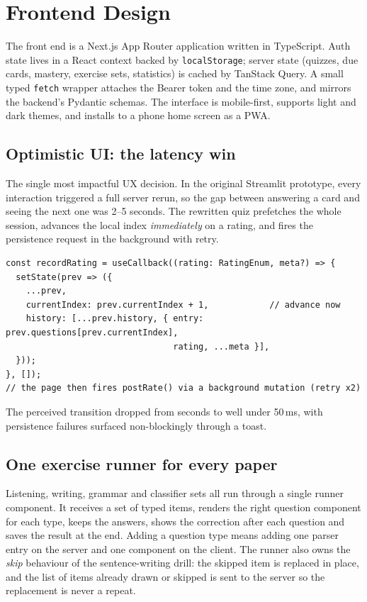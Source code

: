 \documentclass[11pt,a4paper]{article}
\begin{document}
\section{Frontend Design}

The front end is a Next.js App Router application written in TypeScript. Auth
state lives in a React context backed by \texttt{localStorage}; server state
(quizzes, due cards, mastery, exercise sets, statistics) is cached by TanStack
Query. A small typed \texttt{fetch} wrapper attaches the Bearer token and the
time zone, and mirrors the backend's Pydantic schemas. The interface is
mobile-first, supports light and dark themes, and installs to a phone home
screen as a PWA.

\subsection{Optimistic UI: the latency win}

The single most impactful UX decision. In the original Streamlit prototype,
every interaction triggered a full server rerun, so the gap between answering a
card and seeing the next one was 2--5 seconds. The rewritten quiz prefetches
the whole session, advances the local index \emph{immediately} on a rating, and
fires the persistence request in the background with retry.

\begin{lstlisting}[language=TypeScriptX,caption={Optimistic advance --- the
next card renders before the network call resolves.}]
const recordRating = useCallback((rating: RatingEnum, meta?) => {
  setState(prev => ({
    ...prev,
    currentIndex: prev.currentIndex + 1,            // advance now
    history: [...prev.history, { entry: prev.questions[prev.currentIndex],
                                 rating, ...meta }],
  }));
}, []);
// the page then fires postRate() via a background mutation (retry x2)
\end{lstlisting}

The perceived transition dropped from seconds to well under 50\,ms, with
persistence failures surfaced non-blockingly through a toast.

\subsection{One exercise runner for every paper}

Listening, writing, grammar and classifier sets all run through a single
runner component. It receives a set of typed items, renders the right question
component for each type, keeps the answers, shows the correction after each
question and saves the result at the end. Adding a question type means adding
one parser entry on the server and one component on the client. The runner
also owns the \emph{skip} behaviour of the sentence-writing drill: the skipped
item is replaced in place, and the list of items already drawn or skipped is
sent to the server so the replacement is never a repeat.
\end{document}
